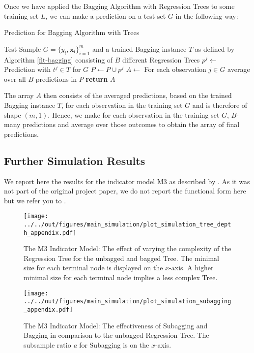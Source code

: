 Once we have applied the Bagging Algorithm with Regression Trees to some training set $L$, we can make a prediction on a test set $G$ in the following way:

\begin{algorithm}
  \caption{Prediction for Bagging Algorithm with Trees}
  \label{predict-bagging}
  \begin{algorithmic}[1] %
    \Require Test Sample $G = \{y_{i},\mathbf{x_{i}} \}_{i=1}^{m}$ and a trained Bagging instance $T$ as defined by Algorithm \ref{fit-bagging} consisting of $B$ different Regression Trees
      \State $p^j \gets$ Prediction with $t^j \in T$ for $G$
      \State $P \gets P \cup p^j$
      \EndFor
      \State $A \gets$ For each observation $j \in G$ average over all $B$ predictions in $P$
      \State \textbf{return} $A$
    \EndFunction

  \end{algorithmic}
\end{algorithm}

The array $A$ then consists of the averaged predictions, based on the trained Bagging instance $T$, for each observation in the training set $G$ and is therefore of shape $(m,1)$. Hence, we make for each observation in the training set $G$, $B$-many predictions and average over those outcomes to obtain the array of final predictions.

\subsection{Further Simulation Results}
We report here the results for the indicator model M3 as described by \cite{buhlmann2003bagging}.
As it was not part of the original project paper, we do not report the functional form here but we
refer you to \cite{buhlmann2003bagging}.

\begin{figure}[H]
\centering
\texttt{[image: ../../out/figures/main\_simulation/plot\_simulation\_tree\_depth\_appendix.pdf]}
\caption[]{The M3 Indicator Model: The effect of varying the complexity of the Regression Tree for the unbagged and bagged Tree. The minimal size for each terminal node is displayed on the $x$-axis. A higher minimal size for each terminal node implies a less complex Tree.}
\end{figure}
\begin{figure}[t]
\centering
\texttt{[image: ../../out/figures/main\_simulation/plot\_simulation\_subagging\_appendix.pdf]}
\caption[]{The M3 Indicator Model: The effectiveness of Subagging and Bagging in comparison to the unbagged Regression Tree. The subsample ratio \textit{a} for Subagging is on the $x$-axis.}
\end{figure}

